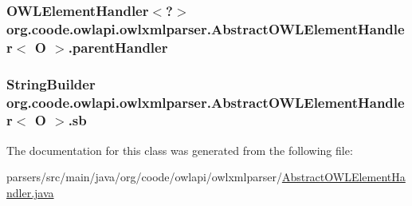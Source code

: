 \hypertarget{classorg_1_1coode_1_1owlapi_1_1owlxmlparser_1_1_abstract_o_w_l_element_handler_3_01_o_01_4_a9a2f5d6be585e721a09d2b1659f77ea4}{
\subsubsection[{parent\-Handler}]{\setlength{\rightskip}{0pt plus 5cm}O\-W\-L\-Element\-Handler$<$?$>$ org.\-coode.\-owlapi.\-owlxmlparser.\-Abstract\-O\-W\-L\-Element\-Handler$<$ O $>$.parent\-Handler\hspace{0.3cm}{\ttfamily [private]}}}\label{classorg_1_1coode_1_1owlapi_1_1owlxmlparser_1_1_abstract_o_w_l_element_handler_3_01_o_01_4_a9a2f5d6be585e721a09d2b1659f77ea4}
\hypertarget{classorg_1_1coode_1_1owlapi_1_1owlxmlparser_1_1_abstract_o_w_l_element_handler_3_01_o_01_4_a43c0deb7f569bbb46313a7d023858c25}{
\subsubsection[{sb}]{\setlength{\rightskip}{0pt plus 5cm}String\-Builder org.\-coode.\-owlapi.\-owlxmlparser.\-Abstract\-O\-W\-L\-Element\-Handler$<$ O $>$.sb\hspace{0.3cm}{\ttfamily [private]}}}\label{classorg_1_1coode_1_1owlapi_1_1owlxmlparser_1_1_abstract_o_w_l_element_handler_3_01_o_01_4_a43c0deb7f569bbb46313a7d023858c25}


The documentation for this class was generated from the following file\-:\begin{DoxyCompactItemize}
\item 
parsers/src/main/java/org/coode/owlapi/owlxmlparser/\hyperlink{_abstract_o_w_l_element_handler_8java}{Abstract\-O\-W\-L\-Element\-Handler.\-java}\end{DoxyCompactItemize}

